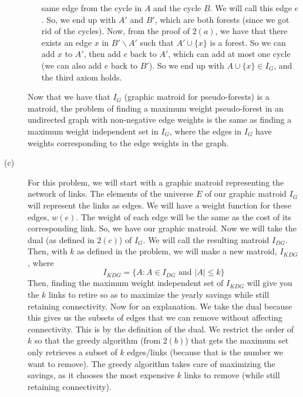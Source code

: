 \documentclass{article}
\begin{document}
\begin{description}
\begin{itemize}
                same edge from the cycle in $A$ and the cycle $B$. We will call
                this edge $e$. So, we end up with $A'$ and $B'$, which are both
                forests (since we got rid of the cycles). Now, from the proof of
                $2(a)$, we have that there exists an edge $x$ in $B' \backslash A'$
                such that $A' \cup \{x\}$ is a forest. So we can add
                $x$ to $A'$, then add $e$ back
                to $A'$, which can add at most one cycle (we can also add $e$
                back to $B'$). So we end up with $A \cup \{x\} \in I_G$, and the
                third axiom holds.
        \end{itemize}
        Now that we have that $I_G$ (graphic matroid for pseudo-forests)
        is a matroid, the problem of finding a
        maximum weight pseudo-forest in an undirected graph with non-negative
        edge weights is the same as finding a maximum weight independent set in
        $I_G$, where the edges in $I_G$ have weights corresponding to the edge
        weights in the graph.
    \item[(c)]
        For this problem, we will start with a graphic matroid representing the
        network of links. The elements of the universe $E$ of our graphic
        matroid $I_G$ will represent the links as edges. We will have a weight function
        for these edges, $w(e)$. The weight of each edge will be the same as the
        cost of its corresponding link. So, we have our graphic matroid.
        Now we will take the dual (as defined in $2(c)$) of $I_G$. We
        will call the resulting matroid $I_{DG}$. Then, with $k$ as defined in
        the problem, we will make a new matroid, $I_{KDG}$, where
        \[ I_{KDG} = \{ A : A \in I_{DG} \text{ and } |A| \leq k \} \]
        Then, finding the maximum weight independent set of $I_{KDG}$ will give
        you the $k$ links to retire so as to maximize the yearly savings while
        still retaining connectivity. Now for an explanation.
        We take the dual because this gives us the subsets of edges that we can remove
        without affecting connectivity. This is by the definition of the dual.
        We restrict the order of $k$ so that the
        greedy algorithm (from $2(b)$) that gets the maximum set only retrieves
        a subset of $k$
        edges/links (because that is the number we want to remove). The greedy
        algorithm takes care of maximizing the savings, as it chooses the most
        expensive $k$ links to remove (while still retaining connectivity).
\end{description}
\newpage
\end{document}
